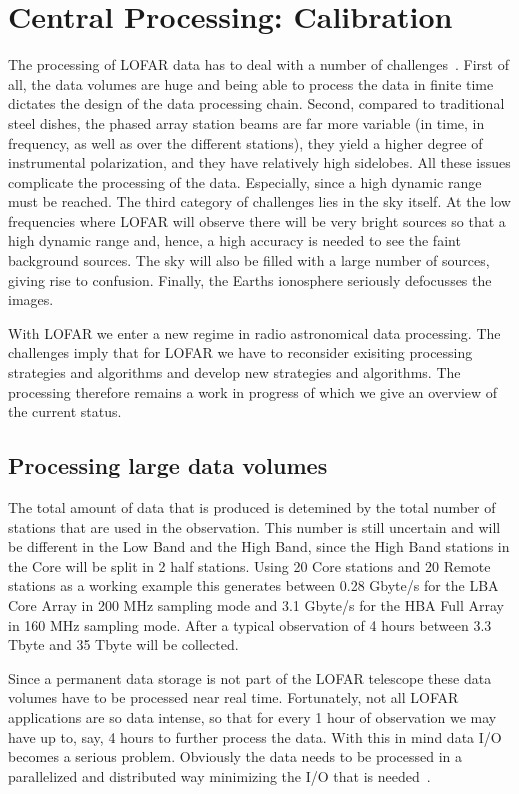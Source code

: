 \documentclass[journal]{IEEEtran}
\begin{document}
\section{Central Processing: Calibration}

The processing of LOFAR data has to deal with a number of challenges~\cite{Noordam:04,Nijboer:07}. First of all, the data volumes are huge and being able to process the data in finite time dictates the design of the data processing chain. Second, compared to traditional steel dishes, the phased array station beams are far more variable (in time, in frequency, as well as over the different stations), they yield a higher degree of instrumental polarization, and they have relatively high sidelobes. All these issues complicate the processing of the data. Especially, since a high dynamic range must be reached. The third category of challenges lies in the sky itself. At the low frequencies where LOFAR will observe there will be very bright sources so that a high dynamic range and, hence, a high accuracy is needed to see the faint background sources. The sky will also be filled with a large number of sources, giving rise to confusion. Finally, the Earths ionosphere seriously defocusses the images.

With LOFAR we enter a new regime in radio astronomical data processing.  The challenges imply that for LOFAR we have to reconsider exisiting processing strategies and algorithms and develop new strategies and algorithms. The processing therefore remains a work in progress of which we give an overview of the current status.

\subsection{Processing large data volumes}

The total amount of data that is produced is detemined by the total number of stations that are used in the observation. This number is still uncertain and will be different in the Low Band and the High Band, since the High Band stations in the Core will be split in 2 half stations. Using 20 Core stations and 20 Remote stations as a working example this generates between 0.28 Gbyte/s for the LBA Core Array in 200 MHz sampling mode and 3.1 Gbyte/s for the HBA Full Array in 160 MHz sampling mode. After a typical observation of 4 hours between 3.3 Tbyte and 35 Tbyte will be collected.

Since a permanent data storage is not part of the LOFAR telescope these data volumes have to be processed near real time. Fortunately, not all LOFAR applications are so data intense, so that for every 1 hour of observation we may have up to, say, 4 hours to further process the data. With this in mind data I/O becomes a serious problem. Obviously the data needs to be processed in a parallelized and distributed way minimizing the I/O that is needed~\cite{Loose:08,Diepen:08}.  
 
\end{document}

